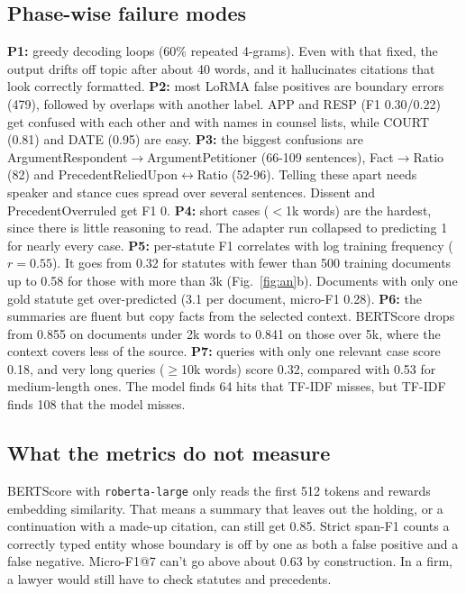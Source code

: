\documentclass[11pt, oneside]{article}
\begin{document}
\subsection{Phase-wise failure modes}
\textbf{P1:}  greedy decoding loops (60\% repeated 4-grams). Even with that fixed, the
output drifts off topic after about 40 words, and it hallucinates citations
that look correctly formatted.
\textbf{P2:}  most LoRMA false positives are boundary errors (479), followed by overlaps
with another label. APP and RESP (F1 0.30/0.22) get confused with each other
and with names in counsel lists, while COURT (0.81) and DATE (0.95) are easy.
\textbf{P3:}  the biggest confusions are
ArgumentRespondent$\rightarrow$ArgumentPetitioner (66-109 sentences),
Fact$\rightarrow$Ratio (82) and PrecedentReliedUpon$\leftrightarrow$Ratio
(52-96). Telling these apart needs speaker and stance cues spread over
several sentences. Dissent and PrecedentOverruled get F1 0.
\textbf{P4:}  short cases ($<$1k words) are the hardest, since there is little reasoning
to read. The adapter run collapsed to predicting 1 for nearly every case.
\textbf{P5:}  per-statute F1 correlates with log training frequency ($r = 0.55$). It
goes from 0.32 for statutes with fewer than 500 training documents up to 0.58
for those with more than 3k (Fig.~\ref{fig:an}b). Documents with only one gold statute
get over-predicted (3.1 per document, micro-F1 0.28).
\textbf{P6:}  the summaries are fluent but copy facts from the selected context.
BERTScore drops from 0.855 on documents under 2k words to 0.841 on those over
5k, where the context covers less of the source.
\textbf{P7:}  queries with only one relevant case score 0.18, and very long queries
($\ge$10k words) score 0.32, compared with 0.53 for medium-length ones. The
model finds 64 hits that TF-IDF misses, but TF-IDF finds 108 that the model
misses.

\subsection{What the metrics do not measure}
BERTScore with \texttt{roberta-large} only reads the first 512 tokens and
rewards embedding similarity. That means a summary that leaves out the
holding, or a continuation with a made-up citation, can still get 0.85.  Strict
span-F1 counts a correctly typed entity whose boundary is off by one as both a
false positive and a false negative. Micro-F1@7 can't go above about 0.63 by
construction. In a firm, a lawyer would still have to check statutes and precedents.
\end{document}
